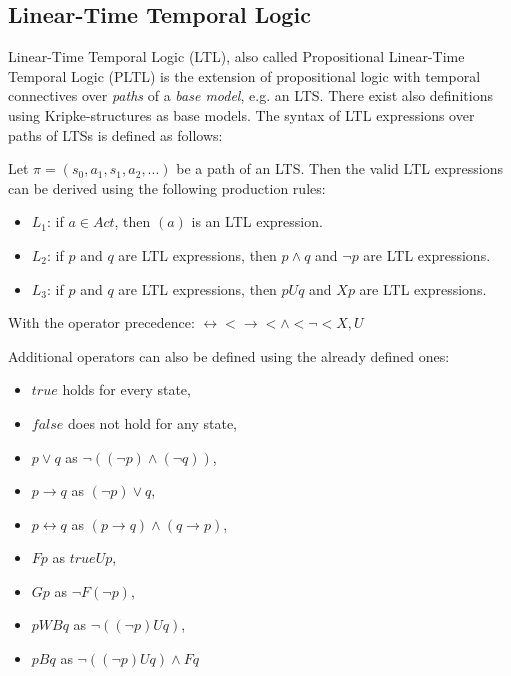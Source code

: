 \subsection{Linear-Time Temporal Logic} \label{subs_backgrltl}
Linear-Time Temporal Logic (LTL), also called Propositional Linear-Time Temporal Logic (PLTL) is the extension of propositional logic with temporal connectives over \textit{paths} of a \textit{base model}, e.g. an LTS. There exist also definitions using Kripke-structures \cite{Kripke1963-KRISCO} as base models. The syntax of LTL expressions over paths of LTSs is defined as follows:

\begin{definition}
	Let $\pi = (s_0, a_1, s_1, a_2, ... )$ be a path of an LTS. Then the valid LTL expressions can be derived using the following production rules:
	\begin{itemize}
		\item $L_1$: if $a \in Act$, then $(a)$ is an LTL expression. 
		\item $L_2$: if $p$ and $q$ are LTL expressions, then $p \land q$ and $\neg p$ are LTL expressions.
		\item $L_3$: if $p$ and $q$ are LTL expressions, then $p U q$ and $X p$ are LTL expressions.
	\end{itemize}
	With the operator precedence: $\leftrightarrow  <  \rightarrow  < \land  <  \neg  <  X, U$
\end{definition}

Additional operators can also be defined using the already defined ones:
\begin{itemize}
	\setlength\itemsep{0.2em}
	\item $true$ holds for every state,
	\item $false$ does not hold for any state,  
	\item $p \lor q$ as $\neg((\neg p) \land (\neg q))$,
	\item $p \rightarrow q$ as $(\neg p) \lor q$,
	\item $p \leftrightarrow q$ as $(p \rightarrow q) \land (q \rightarrow p)$,
	\item $F p$ as $true U p$,
	\item $G p$ as $\neg F(\neg p)$,
	\item $p WB q$ as $\neg((\neg p) U q)$,
	\item $p B q$ as $\neg((\neg p) U q) \land F q$
\end{itemize}

